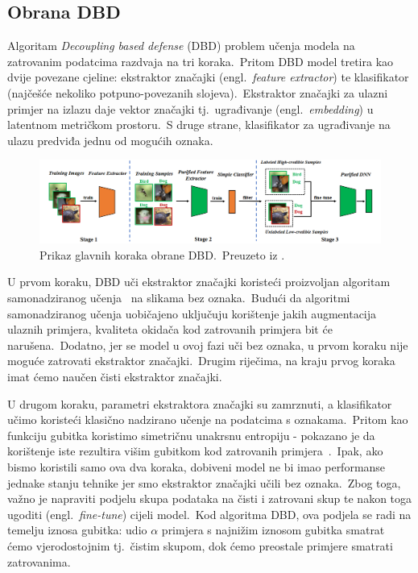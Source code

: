 \documentclass[diplomskirad]{fer}
\begin{document}
\subsection{Obrana DBD}
\label{sub:dbd}

Algoritam \textit{Decoupling based defense} (DBD) problem učenja modela na zatrovanim podatcima razdvaja na tri koraka.\ 
Pritom DBD model tretira kao dvije povezane cjeline: ekstraktor značajki (engl.\ \textit{feature extractor}) te klasifikator (najčešće nekoliko potpuno-povezanih slojeva).\  
Ekstraktor značajki za ulazni primjer na izlazu daje vektor značajki tj.\ ugrađivanje (engl.\ \textit{embedding}) u latentnom metričkom prostoru.\ 
S druge strane, klasifikator za ugrađivanje na ulazu predviđa jednu od mogućih oznaka.\

\begin{figure}[h]
  \centering
  \includegraphics[scale=0.65]{./Slike/dbd.png}
  \caption{Prikaz glavnih koraka obrane DBD.\ Preuzeto iz \cite{huang2022backdoor}.}
  \label{fig:dbd}
\end{figure}
  
U prvom koraku, DBD uči ekstraktor značajki koristeći proizvoljan algoritam samonadziranog učenja~\cite{jaiswal2020survey} na slikama bez oznaka.\ 
Budući da algoritmi samonadziranog učenja uobičajeno uključuju korištenje jakih augmentacija ulaznih primjera, kvaliteta okidača kod zatrovanih primjera bit će narušena.\ 
Dodatno, jer se model u ovoj fazi uči bez oznaka, u prvom koraku nije moguće zatrovati ekstraktor značajki.\ Drugim riječima, na kraju prvog koraka imat ćemo naučen čisti ekstraktor značajki.\ 

U drugom koraku, parametri ekstraktora značajki su zamrznuti, a klasifikator učimo koristeći klasično nadzirano učenje na podatcima s oznakama.\ 
Pritom kao funkciju gubitka koristimo simetričnu unakrsnu entropiju - pokazano je da korištenje iste rezultira višim gubitkom kod zatrovanih primjera~\cite{wang2019symmetric}.\ 
Ipak, ako bismo koristili samo ova dva koraka, dobiveni model ne bi imao performanse jednake stanju tehnike jer smo ekstraktor značajki učili bez oznaka.\ 
Zbog toga, važno je napraviti podjelu skupa podataka na čisti i zatrovani skup te nakon toga ugoditi (engl.\ \textit{fine-tune}) cijeli model.\ 
Kod algoritma DBD, ova podjela se radi na temelju iznosa gubitka: udio $\alpha$ primjera s najnižim iznosom gubitka smatrat ćemo vjerodostojnim tj.\ čistim skupom, dok ćemo preostale primjere smatrati zatrovanima.\ 
\end{document}
